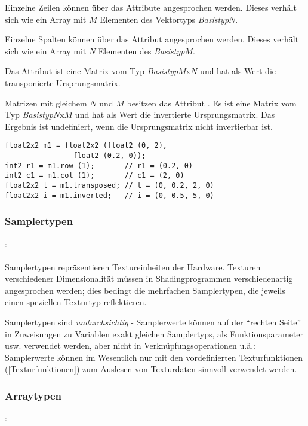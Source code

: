 Einzelne Zeilen können über das Attribute  angesprochen werden. Dieses
verhält sich wie ein Array mit $M$ Elementen des Vektortyps \emph{Basistyp}$N$.

Einzelne Spalten können über das Attribut  angesprochen werden. Dieses
verhält sich wie ein Array mit $N$ Elementen des \emph{Basistyp}$M$.

Das Attribut  ist eine Matrix vom Typ \emph{Basistyp}$M$x$N$
und hat als Wert die transponierte Ursprungsmatrix.

Matrizen mit gleichem $N$ und $M$ besitzen das Attribut .
Es ist eine Matrix vom Typ \emph{Basistyp}$N$x$M$ und hat als Wert die invertierte Ursprungsmatrix.
Das Ergebnis ist undefiniert, wenn die Ursprungsmatrix nicht invertierbar ist.
\begin{lstlisting}
float2x2 m1 = float2x2 (float2 (0, 2),
		        float2 (0.2, 0));
int2 r1 = m1.row (1);       // r1 = (0.2, 0)
int2 c1 = m1.col (1);       // c1 = (2, 0)
float2x2 t = m1.transposed; // t = (0, 0.2, 2, 0)
float2x2 i = m1.inverted;   // i = (0, 0.5, 5, 0)
\end{lstlisting}

\subsubsection{Samplertypen}\label{Samplertypen}
:\label{typ_sampler}\\
\hspace*{1cm}\\

Samplertypen repräsentieren Textureinheiten der Hardware. Texturen verschiedener
Dimensionalität müssen in Shadingprogrammen verschiedenartig angesprochen werden;
dies bedingt die mehrfachen Samplertypen, die jeweils einen speziellen Texturtyp
reflektieren.

Samplertypen sind \emph{undurchsichtig} - Samplerwerte können auf der "`rechten Seite"' in
Zuweisungen zu Variablen exakt gleichen Samplertyps, als Funktionsparameter usw. verwendet werden,
aber nicht in Verknüpfungsoperationen u.ä.:
Samplerwerte können im Wesentlich nur mit den vordefinierten Texturfunktionen (\ref{Texturfunktionen})
zum Auslesen von Texturdaten sinnvoll verwendet werden.


\subsubsection{Arraytypen}\label{Arraytypen}
:\label{typ_array}\\
\hspace*{1cm} \Gspace\Gt{[}\Gspace\Gt{]}\\

